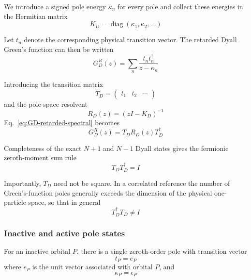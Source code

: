 \documentclass[aip,jcp,reprint,noshowkeys,superscriptaddress]{revtex4-1}
\begin{document}
We introduce a signed pole energy $\kappa_n$ for every pole and collect
these energies in the Hermitian matrix
\begin{equation}
  K_D
  =
  \operatorname{diag}
  \left(
    \kappa_1,\kappa_2,\ldots
  \right)
\end{equation}

Let $t_n$ denote the corresponding physical transition vector.  The
retarded Dyall Green's function can then be written
\begin{equation}
  G_D^R(z)
  =
  \sum_n
  \frac{
    t_nt_n^\dagger
  }{
    z-\kappa_n
  }
  \label{eq:GD-retarded-spectral}
\end{equation}

Introducing the transition matrix
\begin{equation}
  T_D
  =
  \begin{pmatrix}
    t_1&t_2&\cdots
  \end{pmatrix}
\end{equation}
and the pole-space resolvent
\begin{equation}
  R_D(z)
  =
  \left(
    zI-K_D
  \right)^{-1}
\end{equation}
Eq.~\eqref{eq:GD-retarded-spectral} becomes
\begin{equation}
  G_D^R(z)
  =
  T_DR_D(z)T_D^\dagger
  \label{eq:GD-TKT}
\end{equation}

Completeness of the exact $N+1$ and $N-1$ Dyall states gives the
fermionic zeroth-moment sum rule
\begin{equation}
  T_DT_D^\dagger
  =
  I
  \label{eq:TD-isometry}
\end{equation}

Importantly, $T_D$ need not be square.  In a correlated reference the
number of Green's-function poles generally exceeds the dimension of
the physical one-particle space, so that in general
\begin{equation}
  T_D^\dagger T_D
  \neq
  I
\end{equation}


\subsubsection{Inactive and active pole states}

For an inactive orbital $P$, there is a single zeroth-order pole with
transition vector
\begin{equation}
  t_P=e_P
\end{equation}
where $e_P$ is the unit vector associated with orbital $P$, and
\begin{equation}
  \kappa_P=\epsilon_P
\end{equation}
\end{document}
